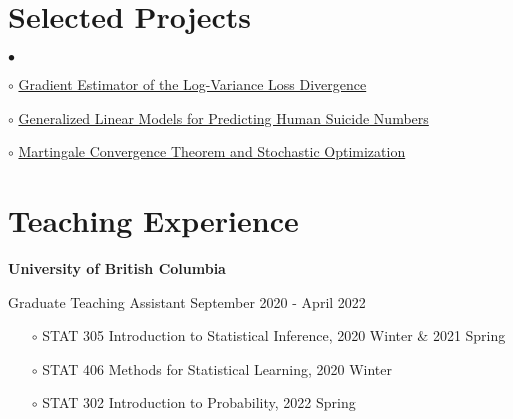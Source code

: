 \documentclass[margin,line]{res}
\newenvironment{list1}{
  \begin{list}{\ding{113}}{%
      \setlength{\itemsep}{0in}
      \setlength{\parsep}{0in} \setlength{\parskip}{0in}
      \setlength{\topsep}{0in} \setlength{\partopsep}{0in}
      \setlength{\leftmargin}{0.17in}}}{\end{list}}
\newenvironment{list2}{
  \begin{list}{$\bullet$}{%
      \setlength{\itemsep}{0in}
      \setlength{\parsep}{0in} \setlength{\parskip}{0in}
      \setlength{\topsep}{0in} \setlength{\partopsep}{0in}
      \setlength{\leftmargin}{0.2in}}}{\end{list}}
\begin{document}
\begin{resume}









\section{\sc Selected Projects}

\begin{list2}
\item[$\circ$] \href{https://github.com/graceyin06/VarGrad}{Gradient Estimator of the Log-Variance Loss
Divergence}
\item[$\circ$] \href{https://github.com/graceyin06/STAT538A-Final-Project/blob/master/project.ipynb}{Generalized Linear Models for Predicting Human Suicide Numbers}
\item[$\circ$] \href{https://github.com/graceyin06/GY-stat547c}{Martingale Convergence Theorem and Stochastic Optimization}
\end{list2}



\section{\sc Teaching Experience}

{\bf University of British Columbia}\\
\vspace*{-.1in}
\begin{list1}
\item[]Graduate Teaching Assistant \hfill September 2020 - April 2022
\begin{itemize}
\item[$\circ$] STAT 305 Introduction to Statistical Inference, 2020 Winter \& 2021 Spring
\item[$\circ$] STAT 406 Methods for Statistical Learning, 2020 Winter
\item[$\circ$] STAT 302 Introduction to Probability, 2022 Spring
\end{itemize}
\end{list1}


\end{resume}
\end{document}
